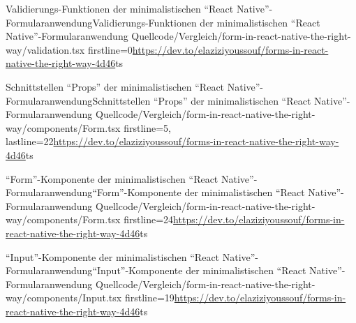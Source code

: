 \begin{fremdeslisting}{Validierungs-Funktionen der minimalistischen \enquote{React Native}-Formularanwendung}{Validierungs-Funktionen der minimalistischen \enquote{React Native}-Formularanwendung}
  {Quellcode/Vergleich/form-in-react-native-the-right-way/validation.tsx}
  {firstline=0}{\url{https://dev.to/elaziziyoussouf/forms-in-react-native-the-right-way-4d46}}{ts}

  \label{lst:VergleichReactNatveValidation}

\end{fremdeslisting}
 
\begin{fremdeslisting}{Schnittstellen \enquote{Props} der minimalistischen \enquote{React Native}-Formularanwendung}{Schnittstellen \enquote{Props} der minimalistischen \enquote{React Native}-Formularanwendung}
  {Quellcode/Vergleich/form-in-react-native-the-right-way/components/Form.tsx}
  {firstline=5, lastline=22}{\url{https://dev.to/elaziziyoussouf/forms-in-react-native-the-right-way-4d46}}{ts}

  \label{lst:VergleichReactNatveForm}

\end{fremdeslisting}

\begin{fremdeslisting}{\enquote{Form}-Komponente der minimalistischen \enquote{React Native}-Formularanwendung}{\enquote{Form}-Komponente der minimalistischen \enquote{React Native}-Formularanwendung}
	{Quellcode/Vergleich/form-in-react-native-the-right-way/components/Form.tsx}
	{firstline=24}{\url{https://dev.to/elaziziyoussouf/forms-in-react-native-the-right-way-4d46}}{ts}

	\label{lst:VergleichReactNatveForm2}

\end{fremdeslisting}

\begin{fremdeslisting}{\enquote{Input}-Komponente der minimalistischen \enquote{React Native}-Formularanwendung}{\enquote{Input}-Komponente der minimalistischen \enquote{React Native}-Formularanwendung}
  {Quellcode/Vergleich/form-in-react-native-the-right-way/components/Input.tsx}
  {firstline=19}{\url{https://dev.to/elaziziyoussouf/forms-in-react-native-the-right-way-4d46}}{ts}

  \label{lst:VergleichReactNatveInput}
  
\end{fremdeslisting} 
